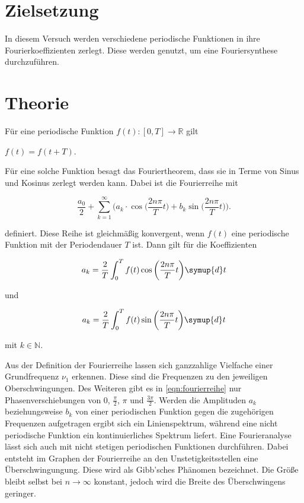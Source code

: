 \section{Zielsetzung}

In diesem Versuch werden verschiedene periodische Funktionen in ihre Fourierkoeffizienten zerlegt. Diese werden genutzt, um eine Fouriersynthese durchzuführen.

\section{Theorie}
\label{sec:Theorie}

Für eine periodische Funktion $f(t):[0, T] \rightarrow \mathds{R}$ gilt

\begin{center}
    $f(t) = f(t + T)$.
\end{center}

Für eine solche Funktion besagt das Fouriertheorem, dass sie in Terme von Sinus und Kosinus zerlegt werden kann.
Dabei ist die Fourierreihe mit

\begin{equation}
\label{eqn:fourierreihe}
    \frac{a_0}{2} + \sum_{k=1}^\infty \bigg( a_k \cdot \cos \bigg( \frac{2 n \pi}{T} t \bigg) + b_k \sin \bigg( \frac{2 n \pi}{T} t \bigg) \bigg).
\end{equation}

definiert. Diese Reihe ist gleichmäßig konvergent, wenn $f(t)$ eine periodische Funktion mit der Periodendauer $T$ ist. Dann gilt für die Koeffizienten

\begin{equation}
\label{eqn:ak}
    a_k = \frac{2}{T} \int_0^T f(t) \cos \bigg( \frac{2 n \pi}{T} t \bigg) \symup{d}t
\end{equation}

und

\begin{equation}
\label{eqn:bk}
    a_k = \frac{2}{T} \int_0^T f(t) \sin \bigg( \frac{2 n \pi}{T} t \bigg) \symup{d}t
\end{equation}

mit $k \in \mathds{N}$.

Aus der Definition der Fourierreihe lassen sich ganzzahlige Vielfache einer Grundfrequenz $\nu_1$ erkennen. Diese sind die Frequenzen zu den jeweiligen Oberschwingungen.
Des Weiteren gibt es in \eqref{eqn:fourierreihe} nur Phasenverschiebungen von $0$, $\frac{\pi}{2}$, $\pi$ und $\frac{3 \pi}{2}$.
Werden die Amplituden $a_k$ beziehungsweise $b_k$ von einer periodischen Funktion gegen die zugehörigen Frequenzen aufgetragen ergibt sich ein Linienspektrum, während eine nicht periodische Funktion ein kontinuierliches Spektrum liefert.
Eine Fourieranalyse lässt sich auch mit nicht stetigen periodischen Funktionen durchführen. Dabei entsteht im Graphen der Fourierreihe an den Unstetigkeitsstellen eine Überschwingungung. Diese wird als Gibb'sches Phänomen bezeichnet. Die Größe bleibt selbst bei $n \rightarrow \infty$ konstant, jedoch wird die Breite des Überschwingens geringer.

